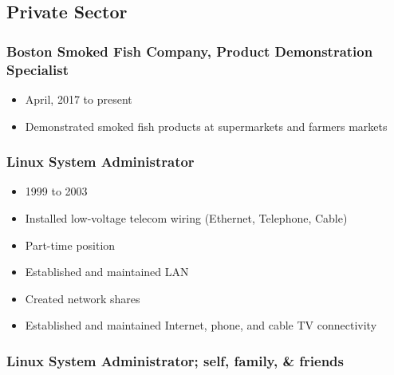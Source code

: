 \documentclass[12pt]{article}
\begin{document}
\subsection{Private Sector}

\subsubsection{Boston Smoked Fish Company, Product Demonstration Specialist}
\begin{itemize}
\item
  April, 2017 to present
\item
  Demonstrated smoked fish products at supermarkets and farmers markets
\end{itemize}

\subsubsection{Linux System Administrator}

\begin{itemize}
\item 1999 to 2003
\item
  Installed low-voltage telecom wiring (Ethernet, Telephone, Cable)
\item
  Part-time position
\item
  Established and maintained LAN
\item
  Created network shares
\item
  Established and maintained Internet, phone, and cable TV connectivity
\end{itemize}

\subsubsection{Linux System Administrator; self, family, \&
friends}
\end{document}
